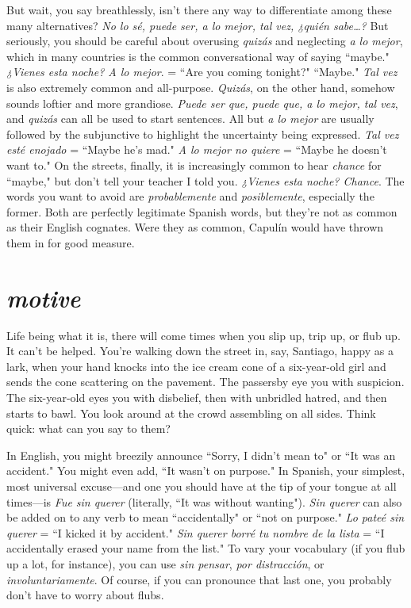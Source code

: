 But wait, you say breathlessly, isn't there any way to differentiate among these many alternatives? \emph{No lo sé, puede ser, a lo mejor, tal vez, ¿quién
sabe\ldots{}?}
But seriously, you should be careful about
overusing \emph{quizás} and neglecting \emph{a lo mejor}, which in many countries
is the common conversational way of saying ``maybe." \emph{¿Vienes esta
noche? A lo mejor}. = ``Are you coming tonight?" ``Maybe." \emph{Tal vez} is
also extremely common and all-purpose. \emph{Quizás}, on the other hand,
somehow sounds loftier and more grandiose. \emph{Puede ser que, puede
que, a lo mejor, tal vez}, and \emph{quizás} can all be used to start sentences.
All but \emph{a lo mejor} are usually followed by the subjunctive to highlight
the uncertainty being expressed. \emph{Tal vez esté enojado} = ``Maybe he's
mad." \emph{A lo mejor no quiere} = ``Maybe he doesn't want to." On the
streets, finally, it is increasingly common to hear \emph{chance} for ``maybe,"
but don't tell your teacher I told you. \emph{¿Vienes esta noche? Chance}. The
words you want to avoid are \emph{probablemente} and \emph{posiblemente}, especially the former. Both are perfectly legitimate Spanish words, but
they're not as common as their English cognates. Were they as common, Capulín would have thrown them in for good measure.

\section{\emph{motive}}

Life being what it is, there will come times when you slip up,
trip up, or flub up. It can't be helped. You're walking down the street
in, say, Santiago, happy as a lark, when your hand knocks into the ice
cream cone of a six-year-old girl and sends the cone scattering on the
pavement. The passersby eye you with suspicion. The six-year-old eyes
you with disbelief, then with unbridled hatred, and then starts to bawl.
You look around at the crowd assembling on all sides. Think quick:
what can you say to them?

In English, you might breezily announce ``Sorry, I didn't mean
to" or ``It was an accident." You might even add, ``It wasn't on purpose." In Spanish, your simplest, most universal excuse---and one you
should have at the tip of your tongue at all times---is \emph{Fue sin querer}
(literally, ``It was without wanting"). \emph{Sin querer} can also be added on
to any verb to mean ``accidentally" or ``not on purpose." \emph{Lo pateé sin
querer} = ``I kicked it by accident." \emph{Sin querer borré tu nombre de la
lista} = ``I accidentally erased your name from the list." To vary your
vocabulary (if you flub up a lot, for instance), you can use \emph{sin pensar},
\emph{por distracción}, or \emph{involuntariamente}. Of course, if you can pronounce
that last one, you probably don't have to worry about flubs.

